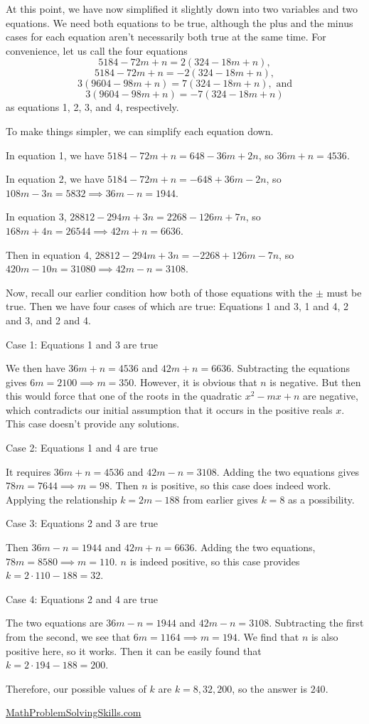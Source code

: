 \begin{enumerate}
 At this point, we have now simplified it slightly down into two variables and two equations. We need both equations to be true, although the plus and the minus cases for each equation aren't necessarily both true at the same time. For convenience, let us call the four equations 
 \[5184-72m+n=2(324-18m+n),\] 
 \[5184-72m+n=-2(324-18m+n),\] 
 \[3(9604-98m+n)=7(324-18m+n), \text{ and}\] 
 \[3(9604-98m+n)=-7(324-18m+n)\] as equations 1, 2, 3, and 4, respectively. 

 To make things simpler, we can simplify each equation down.

 In equation 1, we have $5184-72m+n=648-36m+2n$, so $36m+n=4536$.

 In equation 2, we have $5184-72m+n=-648+36m-2n$, so $108m-3n=5832\implies 36m-n=1944$.

 In equation 3, $28812-294m+3n=2268-126m+7n$, so $168m+4n=26544\implies 42m+n=6636$.

 Then in equation 4, $28812-294m+3n=-2268+126m-7n$, so $420m-10n=31080\implies 42m-n=3108$.

 Now, recall our earlier condition how both of those equations with the $\pm$ must be true. Then we have four cases of which are true: Equations 1 and 3, 1 and 4, 2 and 3, and 2 and 4.

 Case 1: Equations 1 and 3 are true

 We then have $36m+n=4536$ and $42m+n=6636$. Subtracting the equations gives $6m=2100\implies m=350$. However, it is obvious that $n$ is negative. But then this would force that one of the roots in the quadratic $x^2-mx+n$ are negative, which contradicts our initial assumption that it occurs in the positive reals $x$. This case doesn't provide any solutions.

 Case 2: Equations 1 and 4 are true

 It requires $36m+n=4536$ and $42m-n=3108$. Adding the two equations gives $78m=7644\implies m=98$. Then $n$ is positive, so this case does indeed work. Applying the relationship $k=2m-188$ from earlier gives $k=8$ as a possibility.

 Case 3: Equations 2 and 3 are true

 Then $36m-n=1944$ and $42m+n=6636$. Adding the two equations, $78m=8580\implies m=110$. $n$ is indeed positive, so this case provides $k=2\cdot 110-188=32$.

 Case 4: Equations 2 and 4 are true

 The two equations are $36m-n=1944$ and $42m-n=3108$. Subtracting the first from the second, we see that $6m=1164\implies m=194$. We find that $n$ is also positive here, so it works. Then it can be easily found that $k=2\cdot 194-188=200$.

 Therefore, our possible values of $k$ are $k=8,32,200$, so the answer is $\boxed{240}$.

 


 \href{https://mathproblemsolvingskills.wordpress.com/}{MathProblemSolvingSkills.com}

 


 


\end{enumerate}